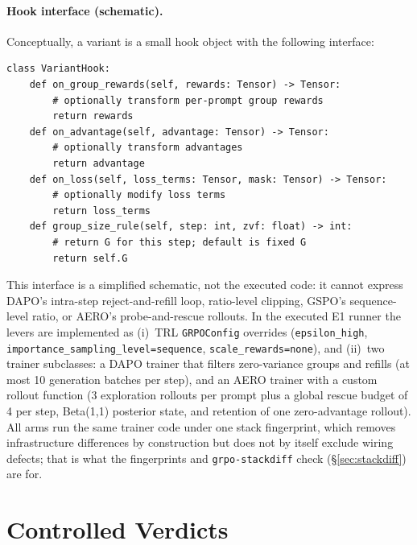 \documentclass[11pt]{article}
\begin{document}
\paragraph{Hook interface (schematic).} Conceptually, a variant is a small
hook object with the following interface:
\begin{verbatim}
class VariantHook:
    def on_group_rewards(self, rewards: Tensor) -> Tensor:
        # optionally transform per-prompt group rewards
        return rewards
    def on_advantage(self, advantage: Tensor) -> Tensor:
        # optionally transform advantages
        return advantage
    def on_loss(self, loss_terms: Tensor, mask: Tensor) -> Tensor:
        # optionally modify loss terms
        return loss_terms
    def group_size_rule(self, step: int, zvf: float) -> int:
        # return G for this step; default is fixed G
        return self.G
\end{verbatim}
This interface is a simplified schematic, not the executed code: it cannot
express DAPO's intra-step reject-and-refill loop, ratio-level clipping, GSPO's
sequence-level ratio, or AERO's probe-and-rescue rollouts. In the executed E1
runner the levers are implemented as (i)~TRL \texttt{GRPOConfig} overrides
(\texttt{epsilon\_high}, \texttt{importance\_sampling\_level=sequence},
\texttt{scale\_rewards=none}), and (ii)~two trainer subclasses: a DAPO trainer
that filters zero-variance groups and refills (at most 10 generation batches
per step), and an AERO trainer with a custom rollout function (3 exploration
rollouts per prompt plus a global rescue budget of 4 per step, Beta(1,1)
posterior state, and retention of one zero-advantage rollout). All arms run the
same trainer code under one stack fingerprint, which removes infrastructure
differences by construction but does not by itself exclude wiring defects;
that is what the fingerprints and \texttt{grpo-stackdiff} check
(\S\ref{sec:stackdiff}) are for.

\section{Controlled Verdicts}
\label{sec:verdict}
\end{document}
